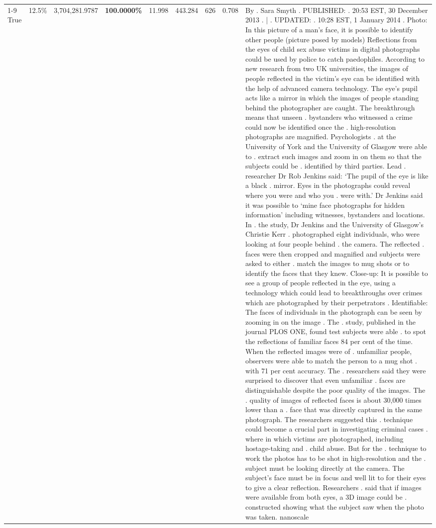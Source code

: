 \begin{table}[H]
\begin{tabular}{lllrlllll}
\cline{1-9}
True & 12.5\% & 3,704,281.9787 & \bfseries \color{red} 100.0000\% & 11.998 & 443.284 & 626 & 0.708 & By . Sara Smyth . PUBLISHED: . 20:53 EST, 30 December 2013 . | . UPDATED: . 10:28 EST, 1 January 2014 . Photo: In this picture of a man's face, it is possible to identify other people (picture posed by models) Reflections from the eyes of child sex abuse victims in digital photographs could be used by police to catch paedophiles. According to new research from two UK universities, the images of people reflected in the victim's eye can be identified with the help of advanced camera technology. The eye's pupil acts like a mirror in which the images of people standing behind the photographer are caught. The breakthrough means that unseen . bystanders who witnessed a crime could now be identified once the . high-resolution photographs are magnified. Psychologists . at the University of York and the University of Glasgow were able to . extract such images and zoom in on them so that the subjects could be . identified by third parties. Lead . researcher Dr Rob Jenkins said: ‘The pupil of the eye is like a black . mirror. Eyes in the photographs could reveal where you were and who you . were with.' Dr Jenkins said it was possible to ‘mine face photographs for hidden information' including witnesses, bystanders and locations. In . the study, Dr Jenkins and the University of Glasgow's Christie Kerr . photographed eight individuals, who were looking at four people behind . the camera. The reflected . faces were then cropped and magnified and subjects were asked to either . match the images to mug shots or to identify the faces that they knew. Close-up: It is possible to see a group of people reflected in the eye, using a technology which could lead to breakthroughs over crimes which are photographed by their perpetrators . Identifiable: The faces of individuals in the photograph can be seen by zooming in on the image . The . study, published in the journal PLOS ONE, found test subjects were able . to spot the reflections of familiar faces 84 per cent of the time. When the reflected images were of . unfamiliar people, observers were able to match the person to a mug shot . with 71 per cent accuracy. The . researchers said they were surprised to discover that even unfamiliar . faces are distinguishable despite the poor quality of the images. The . quality of images of reflected faces is about 30,000 times lower than a . face that was directly captured in the same photograph. The researchers suggested this . technique could become a crucial part in investigating criminal cases . where in which victims are photographed, including hostage-taking and . child abuse. But for the . technique to work the photos has to be shot in high-resolution and the . subject must be looking directly at the camera. The subject's face must be in focus and well lit to for their eyes to give a clear reflection. Researchers . said that if images were available from both eyes, a 3D image could be . constructed showing what the subject saw when the photo was taken. nanoscale \\

\end{tabular}
\end{table}
